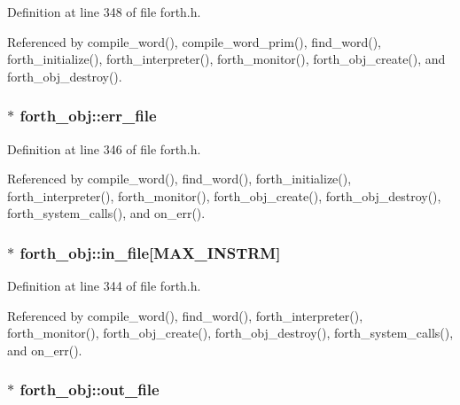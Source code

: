 Definition at line 348 of file forth.\-h.



Referenced by compile\-\_\-word(), compile\-\_\-word\-\_\-prim(), find\-\_\-word(), forth\-\_\-initialize(), forth\-\_\-interpreter(), forth\-\_\-monitor(), forth\-\_\-obj\-\_\-create(), and forth\-\_\-obj\-\_\-destroy().

\hypertarget{structforth__obj_a46cd12633b331e5dd923a0bcab6b5e4a}{
\subsubsection[{err\-\_\-file}]{$\ast$ forth\-\_\-obj\-::err\-\_\-file}}\label{structforth__obj_a46cd12633b331e5dd923a0bcab6b5e4a}


Definition at line 346 of file forth.\-h.



Referenced by compile\-\_\-word(), find\-\_\-word(), forth\-\_\-initialize(), forth\-\_\-interpreter(), forth\-\_\-monitor(), forth\-\_\-obj\-\_\-create(), forth\-\_\-obj\-\_\-destroy(), forth\-\_\-system\-\_\-calls(), and on\-\_\-err().

\hypertarget{structforth__obj_affea97aff17e933a7d4e97a1fb9bac3c}{
\subsubsection[{in\-\_\-file}]{$\ast$ forth\-\_\-obj\-::in\-\_\-file\mbox{[}{\bf M\-A\-X\-\_\-\-I\-N\-S\-T\-R\-M}\mbox{]}}}\label{structforth__obj_affea97aff17e933a7d4e97a1fb9bac3c}


Definition at line 344 of file forth.\-h.



Referenced by compile\-\_\-word(), find\-\_\-word(), forth\-\_\-interpreter(), forth\-\_\-monitor(), forth\-\_\-obj\-\_\-create(), forth\-\_\-obj\-\_\-destroy(), forth\-\_\-system\-\_\-calls(), and on\-\_\-err().

\hypertarget{structforth__obj_a4350825bc239e615e506b0e049bae2e2}{
\subsubsection[{out\-\_\-file}]{$\ast$ forth\-\_\-obj\-::out\-\_\-file}}\label{structforth__obj_a4350825bc239e615e506b0e049bae2e2}



